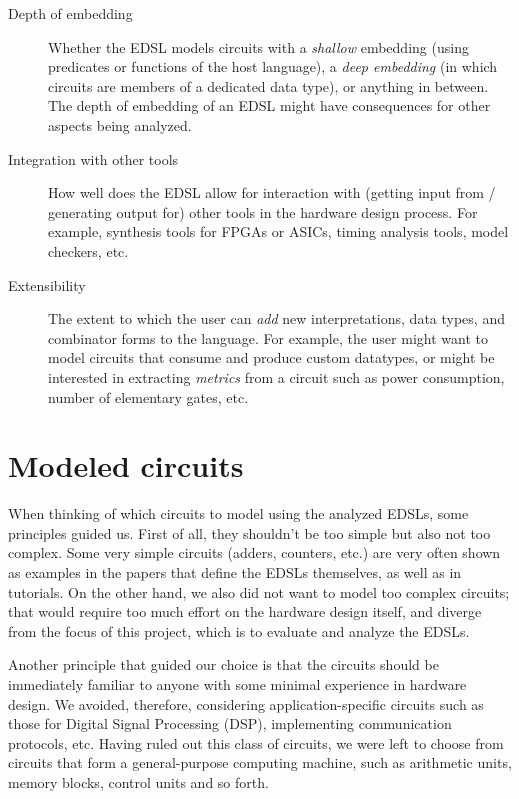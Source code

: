 \documentclass[a4paper]{article}
\begin{document}
\begin{description}
                \item[Depth of embedding]
                    Whether the EDSL models circuits with a \emph{shallow} embedding (using
                    predicates or functions of the host language), a \emph{deep embedding}
                    (in which circuits are members of a dedicated data type), or anything in
                    between. The depth of embedding of an EDSL might have consequences for other
                    aspects being analyzed.

                \item[Integration with other tools]
                    How well does the EDSL allow for interaction with (getting input from / generating
                    output for) other tools in the hardware design process. For example, synthesis
                    tools for FPGAs or ASICs, timing analysis tools, model checkers, etc.

                \item[Extensibility]
                    The extent to which the user can \emph{add} new interpretations, data types, and
                    combinator forms to the language. For example, the user might want to model
                    circuits that consume and produce custom datatypes, or might be interested in
                    extracting \emph{metrics} from a circuit such as power consumption, number of
                    elementary gates, etc.
            \end{description}


    \section{Modeled circuits}
    \label{sec:circuits}
        When thinking of which circuits to model using the analyzed EDSLs, some principles guided
        us. First of all, they shouldn't be too simple but also not too complex. Some very simple
        circuits (adders, counters, etc.) are very often shown as examples in the papers that define
        the EDSLs themselves, as well as in tutorials. On the other hand, we also did not want to
        model too complex circuits; that would require too much effort on the hardware design
        itself, and diverge from the focus of this project, which is to evaluate and analyze the
        EDSLs.

        Another principle that guided our choice is that the circuits should be immediately familiar
        to anyone with some minimal experience in hardware design. We avoided, therefore,
        considering application-specific circuits such as those for Digital Signal Processing (DSP),
        implementing communication protocols, etc. Having ruled out this class of circuits, we were
        left to choose from circuits that form a general-purpose computing machine, such as
        arithmetic units, memory blocks, control units and so forth.
\end{document}
